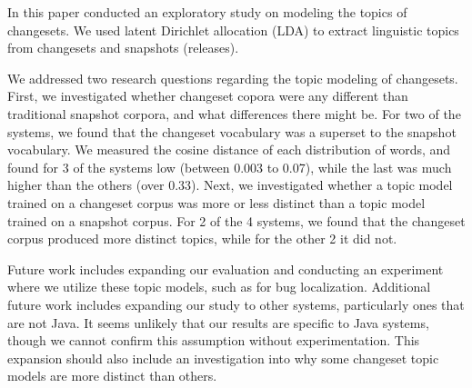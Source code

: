 
In this paper conducted an exploratory study on modeling the topics of
changesets.
We used latent Dirichlet allocation (LDA) to extract linguistic
topics from changesets and snapshots (releases).

We addressed two research questions regarding the topic modeling of changesets.
First, we investigated whether changeset copora were any different than
traditional snapshot corpora, and what differences there might be.
For two of the systems, we found that the changeset vocabulary was a superset
to the snapshot vocabulary.
We measured the cosine distance of each distribution of words,
and found for 3 of the systems low (between 0.003 to 0.07),
while the last was much higher than the others (over 0.33).
Next, we investigated whether a topic model trained on a changeset corpus
was more or less distinct than a topic model trained on a snapshot corpus.
For 2 of the 4 systems, we found that the changeset corpus produced more
distinct topics, while for the other 2 it did not.


Future work includes expanding our evaluation and conducting an experiment
where we utilize these topic models, such as for bug localization.
Additional future work includes expanding our study to other systems, particularly ones that are not Java.
It seems unlikely that our results are specific to Java systems, though we cannot confirm this assumption without experimentation.
This expansion should also include an investigation into why some
changeset topic models are more distinct than others.
 
